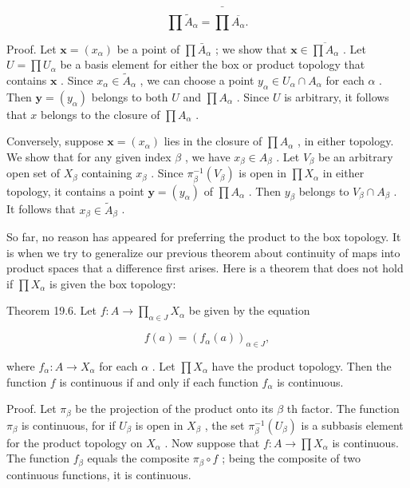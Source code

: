 \[
\prod {\widetilde{A}}_{\alpha } = \bar{\prod }\overline{{A}_{\alpha }}.
\]

Proof. Let \(\mathbf{x} = \left( {x}_{\alpha }\right)\) be a point of \(\prod {\bar{A}}_{\alpha }\) ; we show that \(\mathbf{x} \in  \overline{\prod {A}_{\alpha }}\) . Let \(U = \prod {U}_{\alpha }\) be a basis element for either the box or product topology that contains \(\mathbf{x}\) . Since \({x}_{\alpha } \in  {\widetilde{A}}_{\alpha }\) , we can choose a point \({y}_{\alpha } \in  {U}_{\alpha } \cap  {A}_{\alpha }\) for each \(\alpha\) . Then \(\mathbf{y} = \left( {y}_{\alpha }\right)\) belongs to both \(U\) and \(\prod {A}_{\alpha }\) . Since \(U\) is arbitrary, it follows that \(x\) belongs to the closure of \(\prod {A}_{\alpha }\) .

Conversely, suppose \(\mathbf{x} = \left( {x}_{\alpha }\right)\) lies in the closure of \(\prod {A}_{\alpha }\) , in either topology. We show that for any given index \(\beta\) , we have \({x}_{\beta } \in  {A}_{\beta }\) . Let \({V}_{\beta }\) be an arbitrary open set of \({X}_{\beta }\) containing \({x}_{\beta }\) . Since \({\pi }_{\beta }^{-1}\left( {V}_{\beta }\right)\) is open in \(\prod {X}_{\alpha }\) in either topology, it contains a point \(\mathbf{y} = \left( {y}_{\alpha }\right)\) of \(\prod {A}_{\alpha }\) . Then \({y}_{\beta }\) belongs to \({V}_{\beta } \cap  {A}_{\beta }\) . It follows that \({x}_{\beta } \in  {\widetilde{A}}_{\beta }\) .

So far, no reason has appeared for preferring the product to the box topology. It is when we try to generalize our previous theorem about continuity of maps into product spaces that a difference first arises. Here is a theorem that does not hold if \(\prod {X}_{\alpha }\) is given the box topology:

Theorem 19.6. Let \(f : A \rightarrow  \mathop{\prod }\limits_{{\alpha  \in  J}}{X}_{\alpha }\) be given by the equation

\[
f\left( a\right)  = {\left( {f}_{\alpha }\left( a\right) \right) }_{\alpha  \in  J},
\]

where \({f}_{\alpha } : A \rightarrow  {X}_{\alpha }\) for each \(\alpha\) . Let \(\prod {X}_{\alpha }\) have the product topology. Then the function \(f\) is continuous if and only if each function \({f}_{\alpha }\) is continuous.

Proof. Let \({\pi }_{\beta }\) be the projection of the product onto its \(\beta\) th factor. The function \({\pi }_{\beta }\) is continuous, for if \({U}_{\beta }\) is open in \({X}_{\beta }\) , the set \({\pi }_{\beta }^{-1}\left( {U}_{\beta }\right)\) is a subbasis element for the product topology on \({X}_{\alpha }\) . Now suppose that \(f : A \rightarrow  \prod {X}_{\alpha }\) is continuous. The function \({f}_{\beta }\) equals the composite \({\pi }_{\beta } \circ  f\) ; being the composite of two continuous functions, it is continuous.

